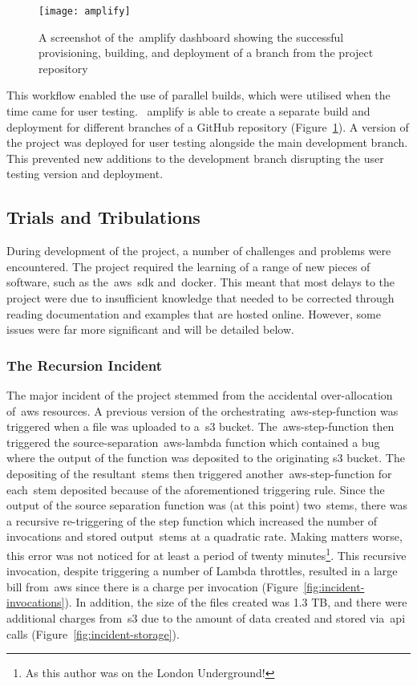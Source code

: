 \begin{figure}[!htb]
    \minipage{\textwidth}
    \texttt{[image: amplify]}
    \caption{A screenshot of the~\gls{amplify} dashboard showing the successful provisioning, building, and deployment of a branch from the project repository}\label{fig:amplify}
    \endminipage
\end{figure}

This workflow enabled the use of parallel builds, which were utilised when the time came for user testing.
~\gls{amplify} is able to create a separate build and deployment for different branches of a GitHub repository
(Figure~\ref{fig:amplify}).
A version of the project was deployed for user testing alongside the main development branch.
This prevented new additions to the development branch disrupting the user testing version and deployment.

\subsection{Trials and Tribulations}\label{subsec:trials-and-tribulations}
During development of the project, a number of challenges and problems were encountered.
The project required the learning of a range of new pieces of software,
such as the~\gls{aws}~\gls{sdk} and~\gls{docker}.
This meant
that most delays to the project were due to insufficient knowledge
that needed to be corrected through reading documentation and examples that are hosted online.
However, some issues were far more significant and will be detailed below.

\subsubsection{The Recursion Incident}\label{subsubsec:recursion-incident}

The major incident of the project stemmed from the accidental over-allocation of~\gls{aws} resources.
A previous version of the orchestrating~\gls{aws-step-function} was triggered
when a file was uploaded to a~\gls{s3} bucket.
The~\gls{aws-step-function} then triggered the source-separation~\gls{aws-lambda} function
which contained a bug where the output of the function was deposited to the originating s3 bucket.
The depositing of the resultant~\glspl{stem} then triggered another~\gls{aws-step-function} for each~\gls{stem}
deposited because of the aforementioned triggering rule.
Since the output of the source separation function was (at this point) two~\glspl{stem},
there was a recursive re-triggering of the step function
which increased the number of invocations and stored output~\glspl{stem} at a quadratic rate.
Making matters worse,
this error was not noticed for at least a period of twenty minutes\footnote{As this author was on the London Underground!}.
This recursive invocation, despite triggering a number of Lambda throttles,
resulted in a large bill from~\gls{aws} since there is a charge per invocation (Figure~\ref{fig:incident-invocations}).
In addition,
the size of the files created was 1.3 TB,
and there were additional charges from~\gls{s3} due to the amount of data created and stored via~\gls{api} calls
(Figure~\ref{fig:incident-storage}).

